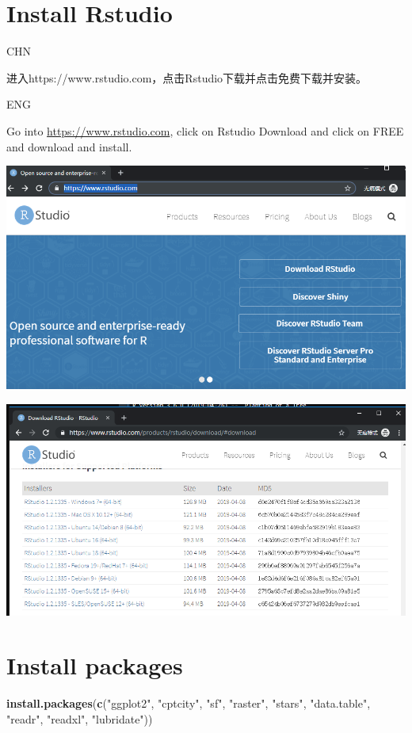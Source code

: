 \documentclass[]{book}
\newenvironment{Shaded}{\begin{snugshade}}{\end{snugshade}}
\newcommand{\KeywordTok}[1]{\textcolor[rgb]{0.13,0.29,0.53}{\textbf{#1}}}
\newcommand{\NormalTok}[1]{#1}
\newcommand{\StringTok}[1]{\textcolor[rgb]{0.31,0.60,0.02}{#1}}
\begin{document}
\hypertarget{install-rstudio}{%
\section{Install Rstudio}\label{install-rstudio}}

CHN

进入https://www.rstudio.com，点击Rstudio下载并点击免费下载并安装。

ENG

Go into \url{https://www.rstudio.com}, click on Rstudio Download and click on FREE and download and install.

\includegraphics{fig/03.png}

\includegraphics{fig/04.png}

\hypertarget{install-packages}{%
\section{Install packages}\label{install-packages}}

\begin{Shaded}
\begin{Highlighting}[]
\KeywordTok{install.packages}\NormalTok{(}\KeywordTok{c}\NormalTok{(}\StringTok{"ggplot2"}\NormalTok{, }\StringTok{"cptcity"}\NormalTok{, }\StringTok{"sf"}\NormalTok{, }\StringTok{"raster"}\NormalTok{, }\StringTok{"stars"}\NormalTok{, }\StringTok{"data.table"}\NormalTok{,}
                   \StringTok{"readr"}\NormalTok{, }\StringTok{"readxl"}\NormalTok{, }\StringTok{"lubridate"}\NormalTok{))}
\end{Highlighting}
\end{Shaded}
\end{document}
